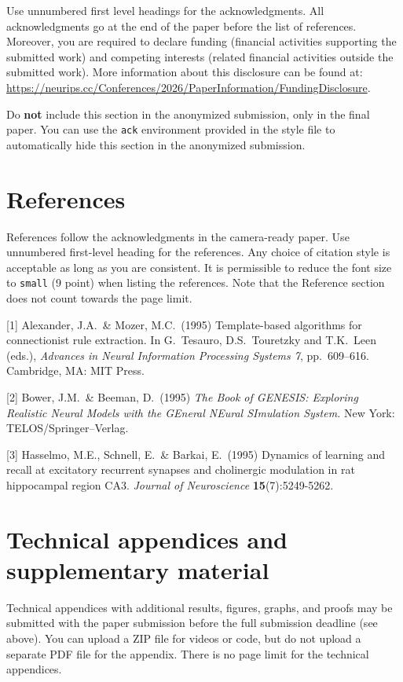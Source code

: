 \documentclass{article}
\begin{document}
\begin{ack}
Use unnumbered first level headings for the acknowledgments. All acknowledgments
go at the end of the paper before the list of references. Moreover, you are required to declare
funding (financial activities supporting the submitted work) and competing interests (related financial activities outside the submitted work).
More information about this disclosure can be found at: \url{https://neurips.cc/Conferences/2026/PaperInformation/FundingDisclosure}.


Do {\bf not} include this section in the anonymized submission, only in the final paper. You can use the \texttt{ack} environment provided in the style file to automatically hide this section in the anonymized submission.
\end{ack}

\section*{References}


References follow the acknowledgments in the camera-ready paper. Use unnumbered first-level heading for
the references. Any choice of citation style is acceptable as long as you are
consistent. It is permissible to reduce the font size to \verb+small+ (9 point)
when listing the references.
Note that the Reference section does not count towards the page limit.
\medskip


{
\small


[1] Alexander, J.A.\ \& Mozer, M.C.\ (1995) Template-based algorithms for
connectionist rule extraction. In G.\ Tesauro, D.S.\ Touretzky and T.K.\ Leen
(eds.), {\it Advances in Neural Information Processing Systems 7},
pp.\ 609--616. Cambridge, MA: MIT Press.


[2] Bower, J.M.\ \& Beeman, D.\ (1995) {\it The Book of GENESIS: Exploring
  Realistic Neural Models with the GEneral NEural SImulation System.}  New York:
TELOS/Springer--Verlag.


[3] Hasselmo, M.E., Schnell, E.\ \& Barkai, E.\ (1995) Dynamics of learning and
recall at excitatory recurrent synapses and cholinergic modulation in rat
hippocampal region CA3. {\it Journal of Neuroscience} {\bf 15}(7):5249-5262.
}



\appendix

\section{Technical appendices and supplementary material}
Technical appendices with additional results, figures, graphs, and proofs may be submitted with the paper submission before the full submission deadline (see above). You can upload a ZIP file for videos or code, but do not upload a separate PDF file for the appendix. There is no page limit for the technical appendices. 
\end{document}
